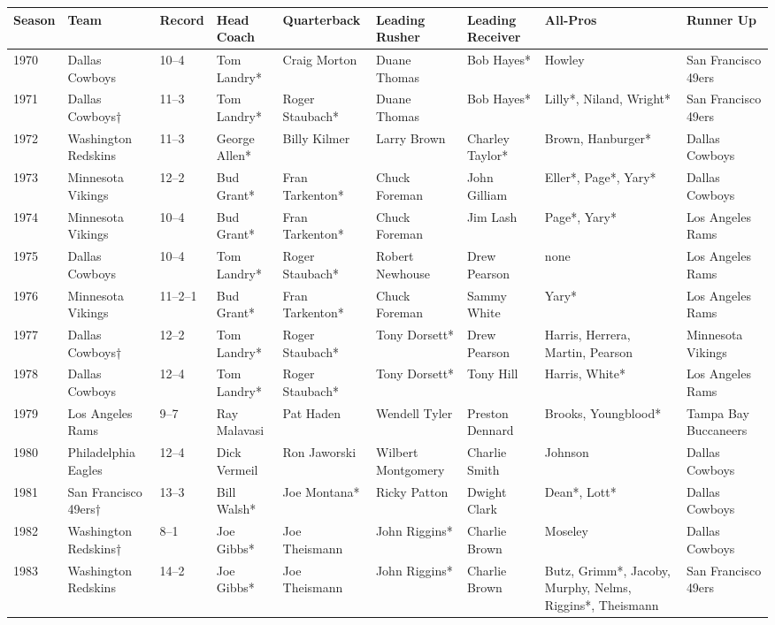 \documentclass{article}
\begin{document}
\begin{tabular}{lllllllll}
\toprule
Season & Team & Record & Head Coach & Quarterback & Leading Rusher & Leading Receiver & All-Pros & Runner Up \\
\midrule
1970 & Dallas Cowboys & 10–4 & Tom Landry* & Craig Morton & Duane Thomas & Bob Hayes* & Howley & San Francisco 49ers \\
1971 & Dallas Cowboys† & 11–3 & Tom Landry* & Roger Staubach* & Duane Thomas & Bob Hayes* & Lilly*, Niland, Wright* & San Francisco 49ers \\
1972 & Washington Redskins & 11–3 & George Allen* & Billy Kilmer & Larry Brown & Charley Taylor* & Brown, Hanburger* & Dallas Cowboys \\
1973 & Minnesota Vikings & 12–2 & Bud Grant* & Fran Tarkenton* & Chuck Foreman & John Gilliam & Eller*, Page*, Yary* & Dallas Cowboys \\
1974 & Minnesota Vikings & 10–4 & Bud Grant* & Fran Tarkenton* & Chuck Foreman & Jim Lash & Page*, Yary* & Los Angeles Rams \\
1975 & Dallas Cowboys & 10–4 & Tom Landry* & Roger Staubach* & Robert Newhouse & Drew Pearson & none & Los Angeles Rams \\
1976 & Minnesota Vikings & 11–2–1 & Bud Grant* & Fran Tarkenton* & Chuck Foreman & Sammy White & Yary* & Los Angeles Rams \\
1977 & Dallas Cowboys† & 12–2 & Tom Landry* & Roger Staubach* & Tony Dorsett* & Drew Pearson & Harris, Herrera, Martin, Pearson & Minnesota Vikings \\
1978 & Dallas Cowboys & 12–4 & Tom Landry* & Roger Staubach* & Tony Dorsett* & Tony Hill & Harris, White* & Los Angeles Rams \\
1979 & Los Angeles Rams & 9–7 & Ray Malavasi & Pat Haden & Wendell Tyler & Preston Dennard & Brooks, Youngblood* & Tampa Bay Buccaneers \\
1980 & Philadelphia Eagles & 12–4 & Dick Vermeil & Ron Jaworski & Wilbert Montgomery & Charlie Smith & Johnson & Dallas Cowboys \\
1981 & San Francisco 49ers† & 13–3 & Bill Walsh* & Joe Montana* & Ricky Patton & Dwight Clark & Dean*, Lott* & Dallas Cowboys \\
1982 & Washington Redskins† & 8–1 & Joe Gibbs* & Joe Theismann & John Riggins* & Charlie Brown & Moseley & Dallas Cowboys \\
1983 & Washington Redskins & 14–2 & Joe Gibbs* & Joe Theismann & John Riggins* & Charlie Brown & Butz, Grimm*, Jacoby, Murphy, Nelms, Riggins*, Theismann & San Francisco 49ers \\

\end{tabular}
\end{document}
